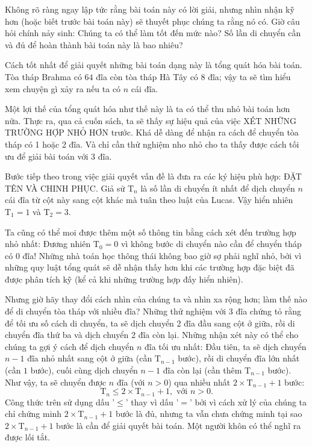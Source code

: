 Không rõ ràng ngay lập tức rằng bài toán này có lời giải, nhưng nhìn nhận kỹ hơn (hoặc biết trước bài toán này) sẽ thuyết phục chúng ta rằng nó có. Giờ câu hỏi chính nảy sinh: Chúng ta có thể làm tốt đến mức nào? Số lần di chuyển cần và đủ để hoàn thành bài toán này là bao nhiêu?

Cách tốt nhất để giải quyết những bài toán dạng này là tổng quát hóa bài toán. Tòa tháp Brahma có $64$ đĩa còn tòa tháp Hà Tây có $8$ đĩa; vậy ta sẽ tìm hiểu xem chuyện gì xảy ra nếu ta có $n$ cái đĩa.

Một lợi thế của tổng quát hóa như thế này là ta có thể thu nhỏ bài toán hơn nữa. Thực ra, qua cả cuốn sách, ta sẽ thấy sự hiệu quả của việc XÉT NHỮNG TRƯỜNG HỢP NHỎ HƠN trước. Khá dễ dàng để nhận ra cách để chuyển tòa tháp có 1 hoặc 2 đĩa. Và chỉ cần thử nghiệm nho nhỏ cho ta thấy được cách tối ưu để giải bài toán với 3 đĩa.

Bước tiếp theo trong việc giải quyết vấn đề là đưa ra các ký hiệu phù hợp: ĐẶT TÊN VÀ CHINH PHỤC. Giả sử $\mathrm{T}_n$ là số lần di chuyển ít nhất để dịch chuyển $n$ cái đĩa từ cột này sang cột khác mà tuân theo luật của Lucas. Vậy hiển nhiên $\mathrm{T}_1 = 1$ và $\mathrm{T}_2 = 3$.

Ta cũng có thể moi được thêm một số thông tin bằng cách xét đến trường hợp nhỏ nhất: Đương nhiên $\mathrm{T}_0 = 0$ vì không bước di chuyển nào cần để chuyển tháp có $0$ đĩa! Những nhà toán học thông thái không bao giờ sợ phải nghĩ nhỏ, bởi vì những quy luật tổng quát sẽ dễ nhận thấy hơn khi các trường hợp đặc biệt đã được phân tích kỹ (kể cả khi những trường hợp đấy hiển nhiên).

Nhưng giờ hãy thay đổi cách nhìn của chúng ta và nhìn xa rộng hơn; làm thế nào để di chuyển tòa tháp với nhiều đĩa? Những thử nghiệm với $3$ đĩa chứng tỏ rằng để tối ưu số cách di chuyển, ta sẽ dịch chuyển 2 đĩa đầu sang cột ở giữa, rồi di chuyển đĩa thứ ba và dịch chuyển 2 đĩa còn lại. Những nhận xét này có thể cho chúng ta gợi ý cách để dịch chuyển $n$ đĩa tối ưu nhất: Đầu tiên, ta sẽ dịch chuyển $n - 1$ đĩa nhỏ nhất sang cột ở giữa (cần $\mathrm{T}_{n - 1}$ bước), rồi di chuyển đĩa lớn nhất (cần $1$ bước), cuối cùng dịch chuyển $n - 1$ đĩa còn lại (cần thêm $\mathrm{T}_{n - 1}$ bước). Như vậy, ta sẽ chuyển được $n$ đĩa (với $n > 0$) qua nhiều nhất $2 \times \mathrm{T}_{n - 1} + 1$ bước:
$$\mathrm{T}_n \le 2 \times \mathrm{T}_{n - 1} + 1, \text{ \ \ \ \ với } n > 0.$$
Công thức trên sử dụng dấu '$\le$' thay vì dấu '$=$' bởi vì cách xử lý của chúng ta chỉ chứng minh $2 \times \mathrm{T}_{n - 1} + 1$ bước là đủ, nhưng ta vẫn chưa chứng minh tại sao $2 \times \mathrm{T}_{n - 1} + 1$ bước là cần để giải quyết bài toán. Một người khôn có thể nghĩ ra được lối tắt.

